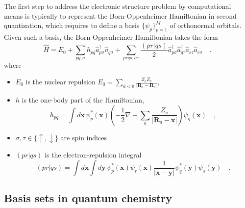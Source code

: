 \documentclass{article}
\newcommand{\pos}[1]{\mathbf{#1}}
\newcommand{\CRE}[1]{\hat{a}^\dagger_{#1}}
\newcommand{\DIS}[1]{\hat{a}^{\phantom{\dagger}}_{#1}}
\begin{document}
The first step to address the electronic structure problem by computational means is 
typically to represent the Born-Oppenheimer Hamiltonian in second quantization,
which requires to define a basis $\{\psi_p\}_{p=1}^M$ of orthonormal orbitals.
Given such a basis, the Born-Oppenheimer Hamiltonian takes the form
\begin{equation}
\hat{H} = E_0 + 
\sum_{pq,\sigma} h_{pq} \CRE{p\sigma} \DIS{q\sigma}
+ \sum_{prqs,\sigma\tau} \frac{(pr|qs)}{2}
\CRE{p\sigma} \CRE{q\tau} \DIS{s\tau} \DIS{r\sigma}
\quad.
\end{equation}
where
\begin{itemize}
\item $E_0$ is the nuclear repulsion $E_0 = \sum_{a<b} \frac{Z_a Z_b}{|\pos{R}_a - \pos{R}_b|}$,
\item $h$ is the one-body part of the Hamiltonian,
\begin{equation}
h_{pq} = \int d \pos{x} \, \psi_p^*(\pos{x}) \left( - \frac{1}{2} \nabla - \sum_{a} \frac{Z_a}{|\pos{R}_a - \pos{x}|} \right) \psi_q(\pos{x})
\quad,
\end{equation}
\item $\sigma,\tau \in \{\uparrow,\downarrow\}$ are spin indices
\item $(pr|qs)$ is the electron-repulsion integral
\begin{equation}
(pr|qs) = 
\int d \pos{x} \int d \pos{y}
\,
\psi_p^*(\pos{x}) \psi_r(\pos{x}) \frac{1}{|\pos{x} -\pos{y}|}
\psi_q^*(\pos{y}) \psi_s(\pos{y})
\quad.
\end{equation}
\end{itemize}

\subsection{Basis sets in quantum chemistry}
\end{document}
